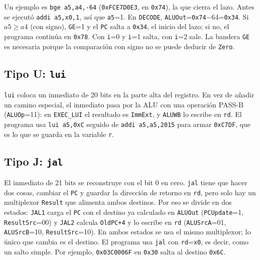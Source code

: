 \documentclass[conference]{IEEEtran}
\newcommand{\cod}[1]{\texttt{\small #1}}
\begin{document}
Un ejemplo es \cod{bge a5,a4,-64} (\cod{0xFCE7D0E3}, en \cod{0x74}), la que cierra el lazo. Antes se ejecutó \cod{addi a5,x0,1}, así que \cod{a5}=1. En \cod{DECODE}, \cod{ALUOut}=\cod{0x74}$-$64=\cod{0x34}. Si $a5\ge a4$ (con signo), \cod{GE}=1 y el \cod{PC} salta a \cod{0x34}, el inicio del lazo; si no, el programa continúa en \cod{0x78}. Con \cod{i}=0 y \cod{i}=1 salta, con \cod{i}=2 sale. La bandera \cod{GE} es necesaria porque la comparación con signo no se puede deducir de \cod{Zero}.

\subsection{Tipo U: \cod{lui}}
\cod{lui} coloca un inmediato de 20 bits en la parte alta del registro. En vez de añadir un camino especial, el inmediato pasa por la ALU con una operación PASS-B (\cod{ALUOp}=11): en \cod{EXEC\_LUI} el resultado es \cod{ImmExt}, y \cod{ALUWB} lo escribe en \cod{rd}. El programa usa \cod{lui a5,0xC} seguido de \cod{addi a5,a5,2015} para armar \cod{0xC7DF}, que es lo que se guarda en la variable \cod{r}.

\subsection{Tipo J: \cod{jal}}
El inmediato de 21 bits se reconstruye con el bit 0 en cero. \cod{jal} tiene que hacer dos cosas, cambiar el \cod{PC} y guardar la dirección de retorno en \cod{rd}, pero solo hay un multiplexor \cod{Result} que alimenta ambos destinos. Por eso se divide en dos estados: \cod{JAL1} carga el \cod{PC} con el destino ya calculado en \cod{ALUOut} (\cod{PCUpdate}=1, \cod{ResultSrc}=00) y \cod{JAL2} calcula \cod{OldPC+4} y lo escribe en \cod{rd} (\cod{ALUSrcA}=01, \cod{ALUSrcB}=10, \cod{ResultSrc}=10). En ambos estados se usa el mismo multiplexor; lo único que cambia es el destino. El programa usa \cod{jal} con \cod{rd}=\cod{x0}, es decir, como un salto simple. Por ejemplo, \cod{0x03C0006F} en \cod{0x30} salta al destino \cod{0x6C}.
\end{document}
